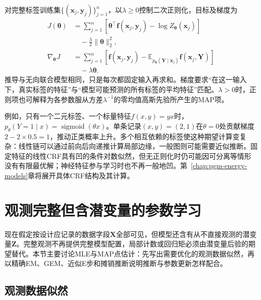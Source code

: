 对完整标签训练集$\{(\bm{x}_j,\bm{y}_j)\}_{j=1}^n$，以$\lambda\geq0$控制二次正则化，目标及梯度为
\begin{equation}
  \begin{aligned}
    J(\bm{\theta})
      &=\sum_{j=1}^n
        \left[\bm{\theta}^\top\bm{f}(\bm{x}_j,\bm{y}_j)
                    -\log Z_{\bm{\theta}}(\bm{x}_j)\right]\\
      &\quad-\frac{\lambda}{2}\lVert\bm{\theta}\rVert_2^2,\\
    \nabla_{\bm{\theta}}J
      &=\sum_{j=1}^n
        \left[\bm{f}(\bm{x}_j,\bm{y}_j)
          -\mathbb{E}_{p_{\bm{\theta}}(\bm{Y}\mid\bm{x}_j)}
             \bm{f}(\bm{x}_j,\bm{Y})\right]\\
      &\quad-\lambda\bm{\theta}.
  \end{aligned}
  \label{eq:pgm-parameter-learning-crf-gradient}
\end{equation}
推导与无向联合模型相同，只是每次都固定输入再求和。梯度要求“在这一输入下，真实标签的特征”与“模型可能预测的所有标签的平均特征”匹配。$\lambda>0$时，正则项也可解释为各参数服从方差$\lambda^{-1}$的零均值高斯先验所产生的MAP项。

例如，只有一个二元标签、一个标量特征$f(x,y)=yx$时，$p_\theta(Y=1\mid x)=\operatorname{sigmoid}(\theta x)$。单条记录$(x,y)=(2,1)$在$\theta=0$处贡献梯度$2-2\times0.5=1$，推动正类概率上升。多个相互依赖的标签使这种期望计算变复杂：线性链可以通过前向后向递推计算局部边缘，一般图则可能需要近似推断。固定特征的线性CRF具有凹的条件对数似然，但无正则化时仍可能因可分离等情形没有有限最优解；神经特征参与学习时也不再一般地凹。第~\ref{chap:pgm-energy-models}章将展开具体CRF结构及其计算。

\section{观测完整但含潜变量的参数学习}
\label{sec:pgm-parameter-learning-latent}

现在假定按设计应记录的数据字段$\bm{X}$全部可见，但模型还含有从不直接观测的潜变量$\bm{Z}$。完整观测不再提供完整模型配置，局部计数或回归矩必须由潜变量后验的期望替代。本节主要讨论MLE与MAP点估计：先写出需要优化的观测数据似然，再以精确EM、GEM、近似E步和摊销推断说明推断与参数更新怎样配合。

\subsection{观测数据似然}
\label{sec:pgm-parameter-learning-marginal-likelihood}

